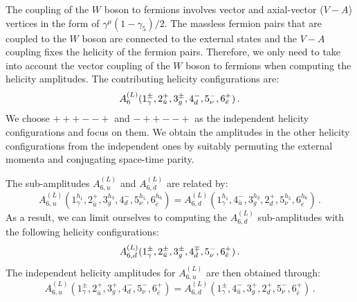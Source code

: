 \documentclass[main.tex]{subfiles}
\begin{document}
The coupling of the $W$ boson to fermions involves vector and axial-vector ($V-A$) vertices in the form of $\gamma^\mu(1-\gamma_5)/2$.
The massless fermion pairs that are coupled to the $W$ boson are connected to the external states and the $V-A$ coupling fixes the helicity of the fermion pairs. Therefore, we only need to take into account the vector coupling of the $W$ boson to fermions when computing the helicity amplitudes. The contributing helicity configurations are:
\begin{equation}
A_{6}^{(L)}(1^\pm_\gamma,2^+_{\bar{u}},3^\pm_g,4^-_d,5^-_{\nu},6^+_{\bar{e}}) \,. 
\nonumber \\ 
\end{equation}
We choose $\scriptstyle +++--+$ and $\scriptstyle -++--+$ as the independent helicity configurations and focus on them. We obtain the amplitudes in the other helicity configurations from the independent ones by suitably permuting the external momenta and conjugating space-time parity.

The sub-amplitudes $A^{(L)}_{6,u}$ and $A^{(L)}_{6,d}$ are related by:
\begin{equation}  \label{Wyjeq:ufromd}
A_{6,u}^{(L)}(1^{h_1}_\gamma,2^+_{\bar{u}},3^{h_3}_g,4^-_d,5^{h_5}_{\nu},6^{h_6}_{\bar{e}})
=
A_{6,d}^{(L)}(1^{h_1}_\gamma,4^-_{\bar{u}},3^{h_3}_g,2^+_d,5^{h_5}_{\nu},6^{h_6}_{\bar{e}}) \,.
\end{equation}
As a result, we can limit ourselves to computing the $A^{(L)}_{6,d}$ sub-amplitudes with the following helicity configurations:
\begin{equation}
A_{6,d}^{(L)}(1^\pm_\gamma,2^\pm_{\bar{u}},3^\pm_g,4^\mp_d,5^-_{\nu},6^+_{\bar{e}})\,.
\nonumber \\ 
\end{equation}
The independent helicity amplitudes for $A^{(L)}_{6,u}$ are then obtained through:
\begin{equation}
A_{6,u}^{(L)}(1^\pm_\gamma,2^+_{\bar{u}},3^+_g,4^-_d,5^-_{\nu},6^+_{\bar{e}})
=
A_{6,d}^{(L)}(1^\pm_\gamma,4^-_{\bar{u}},3^+_g,2^+_d,5^-_{\nu},6^+_{\bar{e}}) \,.
\end{equation}
\end{document}
